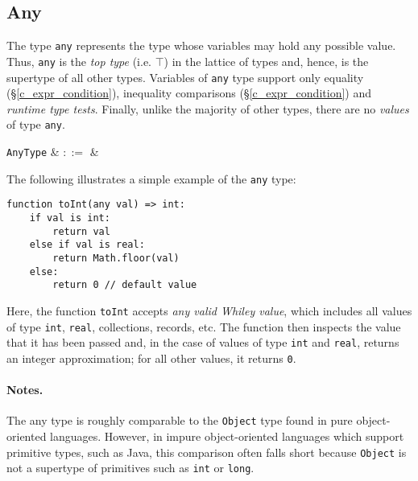 
\subsection{Any}
\label{c_types_any}

The type \lstinline{any} represents the type whose variables may hold any possible value.  Thus, \lstinline{any} is the {\em top type} (i.e. $\top$) in the lattice of types and, hence, is the supertype of all other types.  Variables of \lstinline{any} type support only equality (\S\ref{c_expr_condition}), inequality comparisons (\S\ref{c_expr_condition}) and {\em runtime type tests}.  Finally, unlike the majority of other types, there are no {\em values} of type \lstinline{any}.

\begin{syntax}
  \verb+AnyType+ & $::=$ &  \\
\end{syntax}

\noindent The following illustrates a simple example of the \lstinline{any} type:

\begin{lstlisting}
function toInt(any val) => int:
    if val is int:
        return val
    else if val is real:
        return Math.floor(val)
    else:
        return 0 // default value        
\end{lstlisting}

Here, the function \lstinline{toInt} accepts {\em any valid Whiley value}, which includes all values of type \lstinline{int}, \lstinline{real}, collections, records, etc.  The function then inspects the value that it has been passed and, in the case of values of type \lstinline{int} and \lstinline{real}, returns an integer approximation; for all other values, it returns \lstinline{0}.

\paragraph{Notes.}  The any type is roughly comparable to the \lstinline{Object} type found in pure object-oriented languages.  However, in impure object-oriented languages which support primitive types, such as Java, this comparison often falls short because \lstinline{Object} is not a supertype of primitives such as \lstinline{int} or \lstinline{long}.

